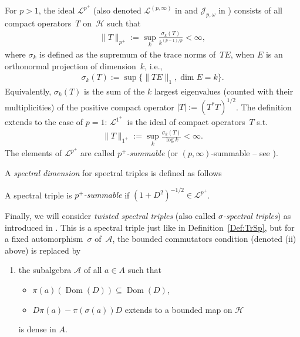 \documentclass[pdftex]{sigma}
\newcommand{\Aa}{\mathcal{A}}
\newcommand{\Hh}{\mathscr{H}}
\newcommand{\Jj}{\mathcal{J}}
\newcommand{\SymmIdeal}{\mathscr{L}}
\DeclareMathOperator{\dom}{Dom}
\numberwithin{equation}{section}
\begin{document}
\begin{Definition}
\label{Def:DixmierSum}
For $p>1$, the ideal $\SymmIdeal^{p^+}$ (also denoted $\SymmIdeal^{(p,\infty )}$ in \cite{NCG} and $\Jj_{p, \omega}$ in \cite[p.~21]{TraceIdealsSimon}) consists of all compact operators~$T$ on~$\Hh$ such that
\begin{gather*}
\| T\|_{p^+} := \sup_k \frac{ \sigma_k(T)}{k^{(p-1)/p}} < \infty,
\end{gather*}
where $\sigma_k$ is def\/ined as the supremum of the trace norms of~$T E$, when $E$ is an orthonormal projection of dimension~$k$, i.e.,
\begin{gather*}
 \sigma_k(T) := \sup \{ \| T E \|_1 , \dim E = k \}.
\end{gather*}
Equivalently, $\sigma_k(T)$ is the sum of the $k$ largest eigenvalues (counted with their multiplicities) of the positive compact operator $|T| := (T^* T)^{1/2}$. The def\/inition extends to the case of $p = 1$: $\SymmIdeal^{1^+}$~is the ideal of compact operators~$T$ s.t.\
\begin{gather*}
\| T \|_{1^+} := \sup_k \frac{ \sigma_k(T)}{\log k} < \infty .
\end{gather*}
The elements of $\SymmIdeal^{p^+}$ are called \emph{$p^+$-summable} (or $(p, \infty )$-summable -- see \cite[Section~IV.2$\alpha$, p.~299 and following]{NCG}).
\end{Definition}

A \emph{spectral dimension} for spectral triples is def\/ined as follows
\begin{Definition}
A spectral triple is \emph{$p^+$-summable} if $(1 + D^2)^{-1/2} \in \SymmIdeal^{p^+}$.
\end{Definition}

Finally, we will consider \emph{twisted spectral triples} (also called \emph{$\sigma$-spectral triples}) as introduced in \cite[Def\/inition~3.1]{TrSpTypeIII}. This is a spectral triple just like in Def\/inition~\ref{Def:TrSp}, but for a f\/ixed automorphism~$\sigma$ of~$\Aa$, the bounded commutators condition (denoted (ii) %
above) is replaced by
\begin{enumerate}\itemsep=0pt
\item[(ii)]
the subalgebra $\Aa$ of all $a\in A$ such that
\begin{itemize}\itemsep=0pt
\item
$\pi(a) (\dom(D)) \subseteq \dom(D)$,
\item
$D\pi(a) - \pi(\sigma(a)) D$ extends to a bounded map on $\Hh$
\end{itemize}
is dense in $A$.
\end{enumerate}
\end{document}
